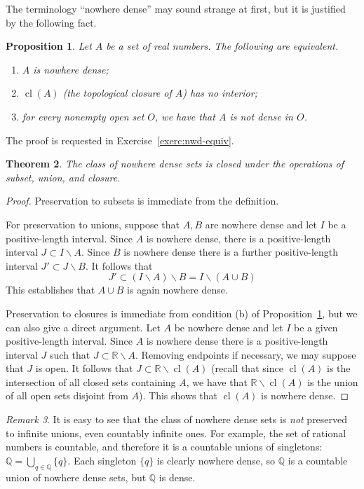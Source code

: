 \documentclass[11pt,oneside]{amsbook}
\newcommand{\QQ}{\mathbb Q}
\newcommand{\RR}{\mathbb R}
\DeclareMathOperator{\cl}{cl}
\theoremstyle{definition}
\theoremstyle{plain}
\newtheorem{thm}{Theorem}[section]
\newtheorem{prop}[thm]{Proposition}
\theoremstyle{definition}
\theoremstyle{remark}
\newtheorem{rem}[thm]{Remark}
\begin{document}
The terminology ``nowhere dense'' may sound strange at first, but it is justified by the following fact.

\begin{prop}
  \label{prop:nwd-equiv}
  Let $A$ be a set of real numbers. The following are equivalent.
\begin{enumerate}
\item $A$ is nowhere dense;
\item $\cl(A)$ (the topological closure of $A$) has no interior;
\item for every nonempty open set $O$, we have that $A$ is not dense in $O$.
\end{enumerate}
\end{prop}

The proof is requested in Exercise~\ref{exerc:nwd-equiv}.

\begin{thm}
  The class of nowhere dense sets is closed under the operations of subset, union, and closure.
\end{thm}

\begin{proof}
  Preservation to subsets is immediate from the definition.

  For preservation to unions, suppose that $A,B$ are nowhere dense and let $I$ be a positive-length interval. Since $A$ is nowhere dense, there is a positive-length interval $J\subset I\smallsetminus A$. Since $B$ is nowhere dense there is a further positive-length interval $J'\subset J\smallsetminus B$. It follows that
\[J'\subset (I\smallsetminus A)\smallsetminus B=I\smallsetminus (A\cup B)
\]
This establishes that $A\cup B$ is again nowhere dense.

Preservation to closures is immediate from condition (b) of Proposition~\ref{prop:nwd-equiv}, but we can also give a direct argument. Let $A$ be nowhere dense and let $I$ be a given positive-length interval. Since $A$ is nowhere dense there is a positive-length interval $J$ such that $J\subset\RR\smallsetminus A$. Removing endpoints if necessary, we may suppose that $J$ is open. It follows that $J\subset\RR\smallsetminus\cl(A)$ (recall that since $\cl(A)$ is the intersection of all closed sets containing $A$, we have that $\RR\smallsetminus\cl(A)$ is the union of all open sets disjoint from $A$). This shows that $\cl(A)$ is nowhere dense.
\end{proof}

\begin{rem}
  It is easy to see that the class of nowhere dense sets is \emph{not} preserved to infinite unions, even countably infinite ones. For example, the set of rational numbers is countable, and therefore it is a countable unions of singletons: $\QQ=\bigcup_{q\in\QQ}\{q\}$. Each singleton $\{q\}$ is clearly nowhere dense, so $\QQ$ is a countable union of nowhere dense sets, but $\QQ$ is dense.
\end{rem}
\end{document}
